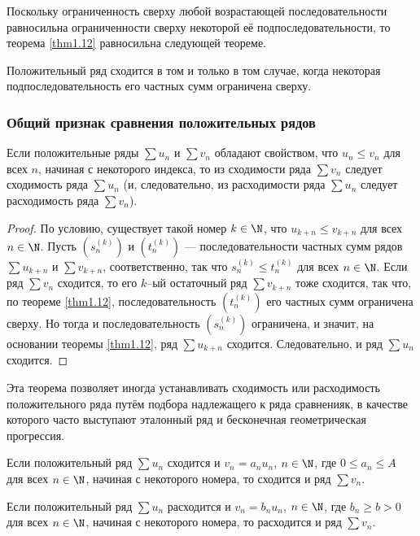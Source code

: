 \documentclass[a4paper]{article}
\begin{document}
Поскольку ограниченность сверху любой возрастающей
последовательности равносильна ограниченности сверху некоторой её
подпоследовательности, то теорема \ref{thm1.12} равносильна
следующей теореме.

\begin{theorem}
Положительный ряд сходится в том и только в том случае, когда
некоторая подпоследовательность его частных сумм ограничена сверху.
\end{theorem}

\subsubsection{Общий признак сравнения положительных рядов}
\begin{theorem}
Если положительные ряды $\sum u_n$ и $\sum v_n$ обладают свойством,
что $u_n\le v_n$ для всех $n$, начиная с некоторого индекса, то из
сходимости ряда $\sum v_n$ следует сходимость ряда $\sum u_n$ (и,
следовательно, из расходимости ряда $\sum u_n$ следует расходимость
ряда $\sum v_n$).
\end{theorem}

\begin{proof}
По условию, существует такой номер $k\in\N$, что $u_{k+n} \le
v_{k+n}$ для всех $n\in\N$. Пусть $(s^{(k)}_n)$ и $(t^{(k)}_n)$
--- последовательности частных сумм рядов $\sum u_{k+n}$ и $\sum
v_{k+n}$, соответственно, так что $s^{(k)}_n \le t^{(k)}_n$ для всех
$n\in\N$. Если ряд $\sum v_n$ сходится, то его $k$--ый остаточный
ряд $\sum v_{k+n}$ тоже сходится, так что, по теореме \ref{thm1.12},
последовательность $(t^{(k)}_n)$ его частных сумм ограничена сверху.
Но тогда и последовательность $(s^{(k)}_n)$ ограничена, и значит, на
основании теоремы \ref{thm1.12}, ряд $\sum u_{k+n}$ сходится.
Следовательно, и ряд $\sum u_n$ сходится.
\end{proof}

Эта теорема позволяет иногда устанавливать сходимость или
расходимость положительного ряда путём подбора надлежащего к ряда
сравненияк, в качестве которого часто выступают эталонный ряд и
бесконечная геометрическая прогрессия.

\begin{imp}\label{imp1.3}
Если положительный ряд $\sum u_n$ сходится и $v_n = a_n u_n$,
$n\in\N$, где $0 \le a_n \le A$ для всех $n\in\N$, начиная с
некоторого номера, то сходится и ряд $\sum v_n$.
\end{imp}

\begin{imp}\label{imp1.4}
Если положительный ряд $\sum u_n$ расходится и $v_n = b_n u_n$,
$n\in\N$, где $b_n \ge b > 0$ для всех $n\in\N$, начиная с
некоторого номера, то расходится и ряд $\sum v_n$.
\end{imp}
\end{document}
